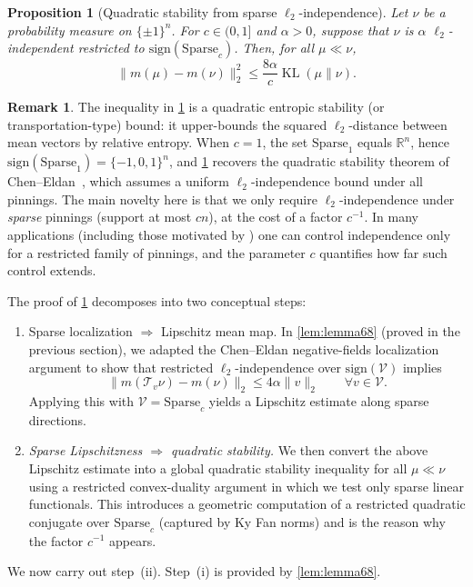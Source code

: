 \documentclass[11pt,reqno,letterpaper]{amsart}
\newcommand{\R}{\mathbb{R}}
\numberwithin{equation}{section}
\newtheorem{proposition}[theorem]{Proposition}
\theoremstyle{definition}
\newtheorem{remark}[theorem]{Remark}
\newcommand{\mc}{\mathcal}
\newcommand{\KL}{\operatorname{KL}}
\begin{document}
\begin{proposition}[Quadratic stability from sparse $\ell_2$-independence]
    \label{prop:quadratic-stability}
Let $\nu$ be a probability measure on $\{\pm 1\}^n$. For $c \in (0,1]$ and $\alpha > 0$, suppose that $\nu$ is $\alpha$ $\ell_2$-independent restricted to $\mathrm{sign}{(\mathrm{Sparse}_c)}$. Then, for all $\mu \ll \nu$,
\[
\|m (\mu) - m(\nu)\|_2^2 \leq \frac{8\alpha}{c}\KL(\mu \|\nu).
\]
\end{proposition}


\begin{remark}
The inequality in \cref{prop:quadratic-stability} is a {quadratic entropic stability} (or
transportation-type) bound: it upper-bounds the squared $\ell_2$-distance between mean vectors by relative
entropy.
When $c=1$, the set $\mathrm{Sparse}_1$ equals $\R^n$, hence $\mathrm{sign}(\mathrm{Sparse}_1)=\{-1,0,1\}^n$,
and \cref{prop:quadratic-stability} recovers the quadratic stability theorem of Chen--Eldan~\cite{chen2022localization}, which assumes a
uniform $\ell_2$-independence bound under {all} pinnings.
The main novelty here is that we only require $\ell_2$-independence under \emph{sparse} pinnings (support at
most $cn$), at the cost of a factor $c^{-1}$. In many applications (including those
motivated by \cite{JMPV}) one can control independence only for a restricted family of pinnings, and the
parameter $c$ quantifies how far such control extends.
\end{remark}

The proof of \cref{prop:quadratic-stability} decomposes into two conceptual steps:
\begin{enumerate}[label=(\roman*),leftmargin=2.2em]
    \item {Sparse localization $\Rightarrow$ Lipschitz mean map.}
    In \cref{lem:lemma68} (proved in the previous section), we adapted the Chen--Eldan negative-fields
    localization argument to show that restricted $\ell_2$-independence over $\mathrm{sign}(\mathcal{V})$
    implies
    \[
    \|m(\mc{T}_v\nu)-m(\nu)\|_2 \le 4\alpha\|v\|_2
    \qquad\forall v\in\mathcal{V}.
    \]
    Applying this with $\mathcal{V}=\mathrm{Sparse}_c$ yields a Lipschitz estimate along sparse directions.
    \item \emph{Sparse Lipschitzness $\Rightarrow$ quadratic stability.}
    We then convert the above Lipschitz estimate into a global quadratic stability inequality
    for all $\mu\ll\nu$ using a restricted convex-duality argument in which we test only {sparse linear} functionals. This introduces a geometric computation of a restricted quadratic
    conjugate over $\mathrm{Sparse}_c$ (captured by Ky Fan norms) and is the reason why the factor
    $c^{-1}$ appears.
\end{enumerate}
We now carry out step~(ii). Step~(i) is provided by \cref{lem:lemma68}.
\end{document}
